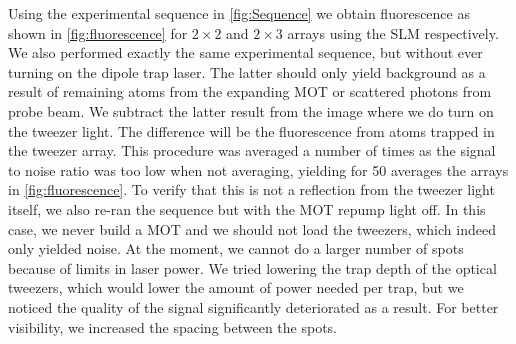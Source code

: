 Using the experimental sequence in \cref{fig:Sequence} we obtain fluorescence as shown in \cref{fig:fluorescence} for $2\times2$ and $2\times3$ arrays using the SLM respectively.
We also performed exactly the same experimental sequence, but without ever turning on the dipole trap laser. 
The latter should only yield background as a result of remaining atoms from the expanding MOT or scattered photons from probe beam.
We subtract the latter result from the image where we do turn on the tweezer light.
The difference will be the fluorescence from atoms trapped in the tweezer array. 
This procedure was averaged a number of times as the signal to noise ratio was too low when not averaging, yielding for 50 averages the arrays in \cref{fig:fluorescence}.
To verify that this is not a reflection from the tweezer light itself, we also re-ran the sequence but with the MOT repump light off.
In this case, we never build a MOT and we should not load the tweezers, which indeed only yielded noise.
At the moment, we cannot do a larger number of spots because of limits in laser power.
We tried lowering the trap depth of the optical tweezers, which would lower the amount of power needed per trap, but we noticed the quality of the signal significantly deteriorated as a result. 
For better visibility, we increased the spacing between the spots. 

